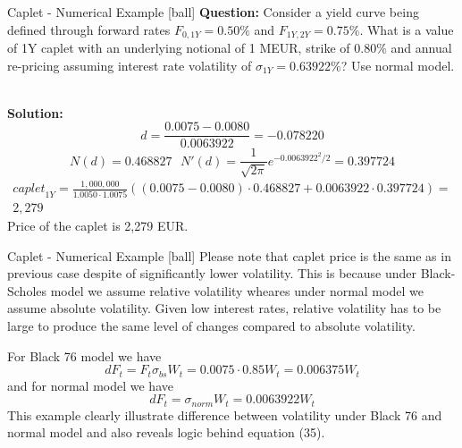 \documentclass{beamer}
\begin{document}
\begin{frame}{Caplet - Numerical Example}
[ball]
\textbf{Question:}
Consider a yield curve being defined through forward rates $F_{0, 1Y} = 0.50\%$ and $F_{1Y, 2Y} = 0.75\%$. What is a value of 1Y caplet with an underlying notional of 1 MEUR, strike of 0.80\% and annual re-pricing assuming interest rate volatility of $\sigma_{1Y} = 0.63922\%$? Use normal model.

\mbox{}\\
\textbf{Solution:}
\begin{equation}
d = \frac{0.0075 - 0.0080}{0.0063922} = -0.078220
\end{equation}
\begin{equation}
N(d) = 0.468827 ~~~ N'(d) = \frac{1}{\sqrt{2 \pi}}e^{-0.0063922^2/2} = 0.397724
\end{equation}
\begin{multline}
\textit{caplet}_{1Y} = \frac{1,000,000}{1.0050 \cdot 1.0075}\left((0.0075 - 0.0080) \cdot 0.468827 + 0.0063922 \cdot 0.397724 \right)=\\
2,279
\end{multline}
Price of the caplet is 2,279 EUR.
\end{frame}

\begin{frame}{Caplet - Numerical Example}
[ball]
Please note that caplet price is the same as in previous case despite of significantly lower volatility. This is because under Black-Scholes model we assume relative volatility wheares under normal model we assume absolute volatility. Given low interest rates, relative volatility has to be large to produce the same level of changes compared to absolute volatility.

For Black 76 model we have
\begin{equation}
dF_t = F_t \sigma_{bs} W_t = 0.0075 \cdot 0.85 W_t = 0.006375 W_t
\end{equation}
and for normal model we have
\begin{equation}
dF_t = \sigma_{norm} W_t = 0.0063922 W_t
\end{equation}
This example clearly illustrate difference between volatility under Black 76 and normal model and also reveals logic behind equation (35).
\end{frame}
\end{document}
